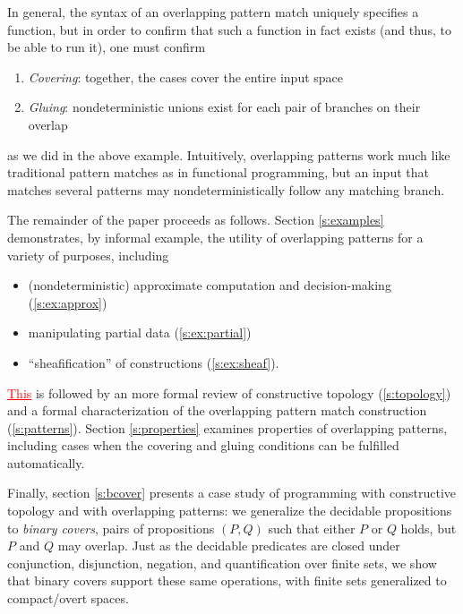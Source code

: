 \documentclass[conference]{IEEEtran}
\newcommand{\R}{\mathbb{R}}
\newcommand{\grammar}[1]{\textcolor{red}{\underline{#1}}}
\begin{document}
In general, the syntax of an overlapping pattern match uniquely specifies a function, but in order to confirm that such a function in fact exists (and thus, to be able to run it), one must confirm
\begin{enumerate}
\item \emph{Covering}: together, the cases cover the entire input space
\item \emph{Gluing}: nondeterministic unions exist for each pair of branches on their overlap
\end{enumerate}
as we did in the above example. Intuitively, overlapping patterns work much like traditional pattern matches as in functional programming, but an input that matches several patterns may nondeterministically follow any matching branch.


The remainder of the paper proceeds as follows. Section \ref{s:examples} demonstrates, by informal example, the utility of overlapping patterns for a variety of purposes, including
\begin{itemize}
\item (nondeterministic) approximate computation and decision-making (\ref{s:ex:approx})
\item manipulating partial data (\ref{s:ex:partial})
\item ``sheafification'' of constructions (\ref{s:ex:sheaf}).
\end{itemize}

\grammar{This} is followed by an more formal review of constructive topology (\ref{s:topology}) and a formal characterization of the overlapping pattern match construction (\ref{s:patterns}). Section \ref{s:properties} examines properties of overlapping patterns, including cases when the covering and gluing conditions can be fulfilled automatically. 

Finally, section \ref{s:bcover} presents a case study of programming with constructive topology and with overlapping patterns: we generalize the decidable propositions to \emph{binary covers}, pairs of propositions $(P, Q)$ such that either $P$ or $Q$ holds, but $P$ and $Q$ may overlap. Just as the decidable predicates are closed under conjunction, disjunction, negation, and quantification over finite sets, we show that binary covers support these same operations, with finite sets generalized to compact/overt spaces.
\end{document}
